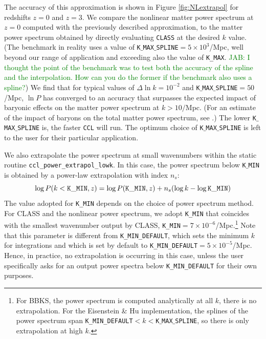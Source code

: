 \documentclass[\docopts]{\docclass}
\newcommand{\jab}[1]{\textcolor{green}{JAB: #1}}
\begin{document}
The accuracy of this approximation is shown in Figure \ref{fig:NLextrapol} for redshifts $z=0$ and $z=3$. We compare the nonlinear matter power spectrum at $z=0$ computed with the previously described approximation, to the matter power spectrum obtained by directly evaluating {\tt CLASS} at the desired $k$ value. (The benchmark in reality uses a value of {\tt K$\_$MAX$\_$SPLINE}$=5\times 10^3$/Mpc, well beyond our range of application and exceeding also the value of {\tt K\_MAX}. \jab{I thought the point of the benchmark was to test both the accuracy of the spline and the interpolation. How can you do the former if the benchmark also uses a spline?}) We find that for typical values of  $\Delta \ln k=10^{-2}$ and {\tt K$\_$MAX$\_$SPLINE}$=50$/Mpc, $\ln P$ has converged to an accuracy that surpasses the expected impact of baryonic effects on the matter power spectrum at $k>10/$Mpc. (For an estimate of the impact of baryons on the total matter power spectrum, see \citealt{Schneider15}.) The lower {\tt K$\_$MAX$\_$SPLINE} is, the faster {\tt CCL} will run. The optimum choice of {\tt K$\_$MAX$\_$SPLINE} is left to the user for their particular application. 

We also extrapolate the power spectrum at small wavenumbers within the static routine {\tt ccl\_power\_extrapol\_lowk}. In this case, the power spectrum below {\tt K$\_$MIN} is obtained by a power-law extrapolation with index $n_s$:
\begin{equation}
  \log P(k<{\tt K\_MIN},z) = \log P({\tt K\_MIN},z) + n_s (\log k-\log{\tt K\_MIN})
\end{equation}
The value adopted for {\tt K\_MIN} depends on the choice of power spectrum method. For CLASS and the nonlinear power spectrum, we adopt {\tt K\_MIN} that coincides with the smallest wavenumber output by CLASS, {\tt K\_MIN}$=7\times 10^{-6}$/Mpc.\footnote{For BBKS, the power spectrum is computed analytically at all $k$, there is no extrapolation. For the Eisenstein \& Hu implementation, the splines of the power spectrum span {\tt K\_MIN\_DEFAULT}$<k<${\tt K$\_$MAX$\_$SPLINE}, so there is only extrapolation at high $k$.} Note that this parameter is different from {\tt K\_MIN\_DEFAULT}, which sets the minimum $k$ for integrations and which is set by default to {\tt K\_MIN\_DEFAULT}$=5\times 10^{-5}$/Mpc. Hence, in practice, no extrapolation is occurring in this case, unless the user specifically asks for an output power spectra below {\tt K\_MIN\_DEFAULT} for their own purposes.
\end{document}
